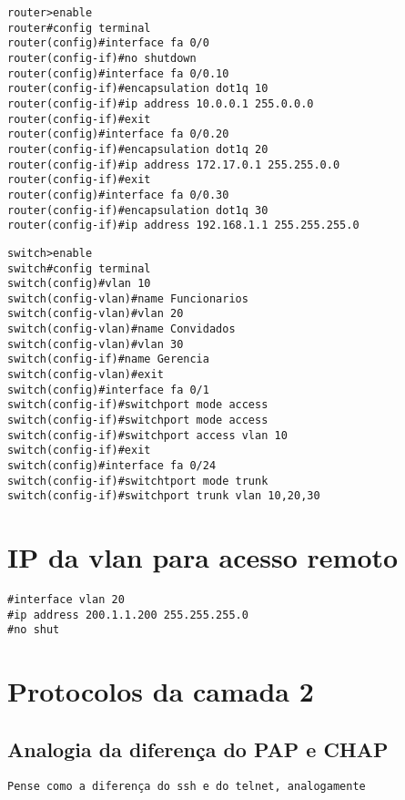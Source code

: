 \documentclass[]{article}
\begin{document}
\begin{verbatim}
router>enable
router#config terminal
router(config)#interface fa 0/0
router(config-if)#no shutdown
router(config)#interface fa 0/0.10
router(config-if)#encapsulation dot1q 10
router(config-if)#ip address 10.0.0.1 255.0.0.0
router(config-if)#exit
router(config)#interface fa 0/0.20
router(config-if)#encapsulation dot1q 20
router(config-if)#ip address 172.17.0.1 255.255.0.0
router(config-if)#exit
router(config)#interface fa 0/0.30
router(config-if)#encapsulation dot1q 30
router(config-if)#ip address 192.168.1.1 255.255.255.0
\end{verbatim}

\begin{verbatim}
switch>enable
switch#config terminal
switch(config)#vlan 10
switch(config-vlan)#name Funcionarios
switch(config-vlan)#vlan 20
switch(config-vlan)#name Convidados
switch(config-vlan)#vlan 30
switch(config-if)#name Gerencia
switch(config-vlan)#exit
switch(config)#interface fa 0/1
switch(config-if)#switchport mode access
switch(config-if)#switchport mode access
switch(config-if)#switchport access vlan 10
switch(config-if)#exit
switch(config)#interface fa 0/24
switch(config-if)#switchtport mode trunk
switch(config-if)#switchport trunk vlan 10,20,30
\end{verbatim}

\hypertarget{ip-da-vlan-para-acesso-remoto}{%
\section{IP da vlan para acesso
remoto}\label{ip-da-vlan-para-acesso-remoto}}

\begin{verbatim}
#interface vlan 20 
#ip address 200.1.1.200 255.255.255.0 
#no shut 
\end{verbatim}

\hypertarget{protocolos-da-camada-2}{%
\section{Protocolos da camada 2}\label{protocolos-da-camada-2}}

\hypertarget{analogia-da-diferenuxe7a-do-pap-e-chap}{%
\subsection{Analogia da diferença do PAP e
CHAP}\label{analogia-da-diferenuxe7a-do-pap-e-chap}}

\texttt{Pense\ como\ a\ diferença\ do\ ssh\ e\ do\ telnet,\ analogamente}
\end{document}
